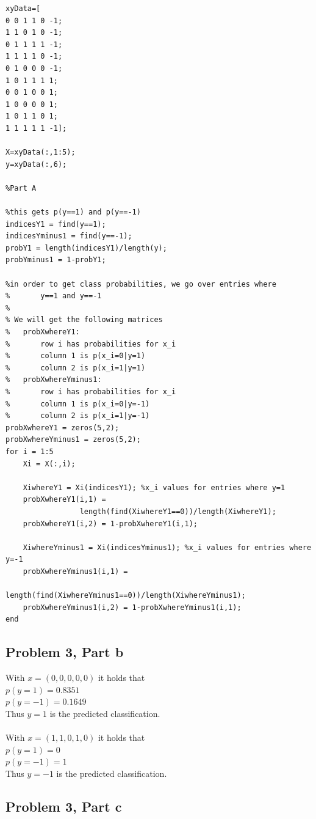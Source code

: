 \documentclass[11pt,psfig]{article}
\begin{document}
\begin{verbatim}
xyData=[
0 0 1 1 0 -1;
1 1 0 1 0 -1;
0 1 1 1 1 -1;
1 1 1 1 0 -1;
0 1 0 0 0 -1;
1 0 1 1 1 1;
0 0 1 0 0 1;
1 0 0 0 0 1;
1 0 1 1 0 1;
1 1 1 1 1 -1];   

X=xyData(:,1:5);
y=xyData(:,6);

%Part A

%this gets p(y==1) and p(y==-1)
indicesY1 = find(y==1);
indicesYminus1 = find(y==-1);
probY1 = length(indicesY1)/length(y);
probYminus1 = 1-probY1;

%in order to get class probabilities, we go over entries where
%       y==1 and y==-1
%
% We will get the following matrices
%   probXwhereY1:
%       row i has probabilities for x_i
%       column 1 is p(x_i=0|y=1)
%       column 2 is p(x_i=1|y=1)
%   probXwhereYminus1:
%       row i has probabilities for x_i
%       column 1 is p(x_i=0|y=-1)
%       column 2 is p(x_i=1|y=-1)
probXwhereY1 = zeros(5,2);
probXwhereYminus1 = zeros(5,2);
for i = 1:5
    Xi = X(:,i);
    
    XiwhereY1 = Xi(indicesY1); %x_i values for entries where y=1
    probXwhereY1(i,1) = 
		         length(find(XiwhereY1==0))/length(XiwhereY1);
    probXwhereY1(i,2) = 1-probXwhereY1(i,1);
    
    XiwhereYminus1 = Xi(indicesYminus1); %x_i values for entries where y=-1
    probXwhereYminus1(i,1) = 
		         length(find(XiwhereYminus1==0))/length(XiwhereYminus1);
    probXwhereYminus1(i,2) = 1-probXwhereYminus1(i,1);
end
\end{verbatim}

\subsection*{Problem 3, Part b}

With $x=(0,0,0,0,0)$ it holds that \\
$p(y=1)=0.8351$\\
$p(y=-1)=0.1649$\\
Thus $y=1$ is the predicted classification.\\
\\
With $x=(1,1,0,1,0)$ it holds that \\
$p(y=1)=0$ \\
$p(y=-1)=1$ \\
Thus $y=-1$ is the predicted classification.\\

\subsection*{Problem 3, Part c}
\end{document}
